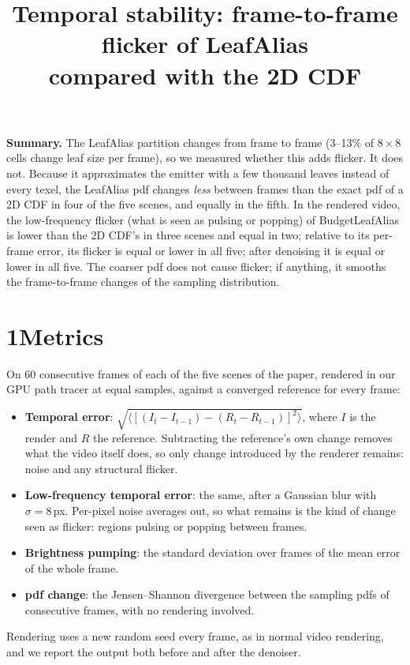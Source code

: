 \documentclass[10pt]{article}
\title{\vspace{-1.6em}Temporal stability: frame-to-frame flicker of LeafAlias\\ compared with the 2D CDF}
\author{}
\date{\vspace{-2.4em}}
\begin{document}
\maketitle
\vspace{-1.0em}

\textbf{Summary.} The LeafAlias partition changes from frame to frame (3--13\% of $8\times8$ cells change leaf size per frame), so we measured whether this adds flicker. It does not. Because it approximates the emitter with a few thousand leaves instead of every texel, the LeafAlias pdf changes \emph{less} between frames than the exact pdf of a 2D CDF in four of the five scenes, and equally in the fifth. In the rendered video, the low-frequency flicker (what is seen as pulsing or popping) of BudgetLeafAlias is lower than the 2D CDF's in three scenes and equal in two; relative to its per-frame error, its flicker is equal or lower in all five; after denoising it is equal or lower in all five. The coarser pdf does not cause flicker; if anything, it smooths the frame-to-frame changes of the sampling distribution.

\section*{1\quad Metrics}

On 60 consecutive frames of each of the five scenes of the paper, rendered in our GPU path tracer at equal samples, against a converged reference for every frame:
\begin{itemize}\setlength{\itemsep}{0pt}
\item \textbf{Temporal error}: $\sqrt{\langle[(I_t - I_{t-1}) - (R_t - R_{t-1})]^2\rangle}$, where $I$ is the render and $R$ the reference. Subtracting the reference's own change removes what the video itself does, so only change introduced by the renderer remains: noise and any structural flicker.
\item \textbf{Low-frequency temporal error}: the same, after a Gaussian blur with $\sigma = 8$\,px. Per-pixel noise averages out, so what remains is the kind of change seen as flicker: regions pulsing or popping between frames.
\item \textbf{Brightness pumping}: the standard deviation over frames of the mean error of the whole frame.
\item \textbf{pdf change}: the Jensen--Shannon divergence between the sampling pdfs of consecutive frames, with no rendering involved.
\end{itemize}
Rendering uses a new random seed every frame, as in normal video rendering, and we report the output both before and after the denoiser.
\end{document}
